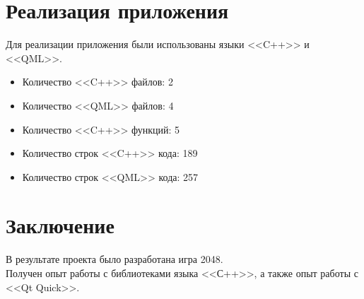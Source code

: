 \documentclass[a4paper,12pt]{article}
\begin{document}
\newpage
\section{Реализация приложения}
Для реализации приложения были использованы языки <<C++>> и <<QML>>.
\begin{itemize}
\item Количество <<C++>> файлов: 2
\item Количество <<QML>> файлов: 4
\item Количество <<C++>> функций: 5
\item Количество строк <<C++>> кода: 189
\item Количество строк <<QML>> кода: 257
\end{itemize}






\newpage
\section*{Заключение}
В результате проекта было разработана игра 2048.
\\

Получен опыт работы с библиотеками языка <<С++>>, а также опыт работы с <<Qt Quick>>.



\newpage
\appendix


\end{document}

